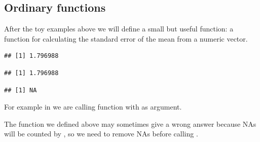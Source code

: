 \documentclass[krantz2]{krantz}\usepackage{knitr}%
\begin{document}
\subsection{Ordinary functions}

After the toy examples above we will define a small but useful function: a function for calculating the standard error of the mean from a numeric vector.

\begin{knitrout}\footnotesize
{}\color{fgcolor}\begin{kframe}
\begin{alltt}
 \hlkwb{<-} \hlstd{(}\hlstd{)\{}\hlstd{(} \hlopt{/} 
 \hlkwb{<-} \hlstd{(}\hlstd{,} \hlstd{,} \hlstd{,} \hlopt{-}\hlstd{)}
 \hlkwb{<-}  \hlstd{)}
\hlstd{(} 
\end{alltt}
\begin{verbatim}
## [1] 1.796988
\end{verbatim}
\begin{alltt}
\end{alltt}
\begin{verbatim}
## [1] 1.796988
\end{verbatim}
\begin{alltt}
\end{alltt}
\begin{verbatim}
## [1] NA
\end{verbatim}
\end{kframe}
\end{knitrout}

For example in  we are calling function  with  as argument.

The function we defined above may sometimes give a wrong answer because NAs will be counted by , so we need to remove NAs before calling .
\end{document}
